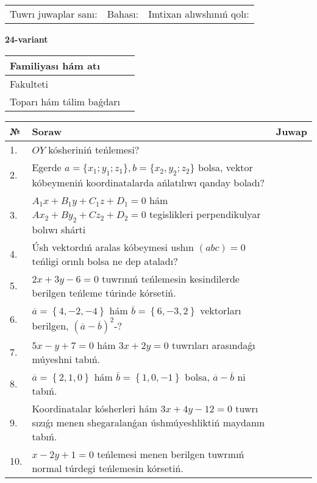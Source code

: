 \documentclass{article}
\begin{document}
\vspace{1cm}

\begin{tabular}{lll}
Tuwrı juwaplar sanı: \underline{\hspace{1.5cm}} & 
Bahası: \underline{\hspace{1.5cm}} & 
Imtixan alıwshınıń qolı: \underline{\hspace{2cm}} \\
\end{tabular}

\egroup

\newpage


\textbf{24-variant}\\

\bgroup
\def\arraystretch{1.6} %

\begin{tabular}{|m{5.7cm}|m{9.5cm}|}
\hline
Familiyası hám atı & \\
\hline
Fakulteti  & \\
\hline
Toparı hám tálim baǵdarı  & \\
\hline
\end{tabular}

\vspace{1cm}

\begin{tabular}{|m{0.7cm}|m{10cm}|m{4cm}|}
\hline
№ & Soraw & Juwap \\
\hline
1. & $OY$ kósheriniń teńlemesi? &  \\
\hline
2. & Egerde $a=\{ x_1; y_1; z_1\}, b=\{ x_2, y_2; z_2\}$ bolsa, vektor kóbeymeniń koordinatalarda ańlatılıwı qanday boladı? &  \\
\hline
3. & $A_1x+B_1y+C_1z+D_1=0$ hám $Ax_2+By_2+Cz_2+D_2=0$ tegislikleri perpendikulyar bolıwı shárti &  \\
\hline
4. & Úsh vektordıń aralas kóbeymesi ushın $(abc)=0$ teńligi orınlı bolsa ne dep ataladı? &  \\
\hline
5. & $2x+3y-6=0$ tuwrınıń teńlemesin kesindilerde berilgen teńleme túrinde kórsetiń. &  \\
\hline
6. & $\overline{a}=\left\{ 4,-2,-4 \right\}$ hám $\overline{b}=\left\{ 6,-3, 2 \right\}$ vektorları berilgen, $(\overline{a}-\overline{b}) ^{2}$-? &  \\
\hline
7. & $5x-y+7=0$ hám $3x+2y=0$ tuwrıları arasındaǵı múyeshni tabıń. &  \\
\hline
8. & $\overline{a}=\left\{ 2, 1, 0 \right\}$ hám $\overline{b}=\left\{ 1, 0,-1 \right\}$ bolsa, $\overline{a}-\overline{b}$ ni tabıń. &  \\
\hline
9. & Koordinatalar kósherleri hám $ 3x+4y-12=0 $ tuwrı sızıǵı menen shegaralanǵan úshmúyeshliktiń maydanın tabıń. &  \\
\hline
10. & $x-2y+1=0$ teńlemesi menen berilgen tuwrınıń normal túrdegi teńlemesin kórsetiń. &  \\
\hline
\end{tabular}
\end{document}
